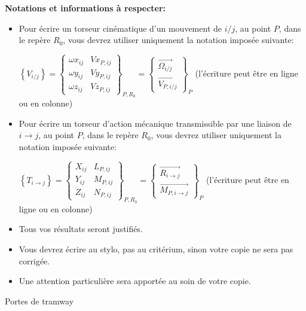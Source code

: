 

\textbf{Notations et informations à respecter:}

\begin{itemize}
 \item Pour écrire un torseur cinématique d'un mouvement de $i/j$, au point $P$, dans le repère $R_0$, vous devrez utiliser uniquement la notation imposée suivante: 

$\left\{V_{i/j}\right\}=\left\{
\begin{matrix}
 \omega x_{ij} & Vx_{P,ij} \\
 \omega y_{ij} & Vy_{P,ij} \\
 \omega z_{ij} & Vz_{P,ij} 
\end{matrix}
\right \}_{P,R_0}=\left \{
\begin{matrix}
 \overrightarrow{\Omega_{i/j}} \\ 
 \overrightarrow{V_{P,i/j}} 
\end{matrix}
\right\}_P$
(l'écriture peut être en ligne ou en colonne)

 \item Pour écrire un torseur d'action mécanique transmissible par une liaison de $i\rightarrow j$, au point $P$, dans le repère $R_0$, vous devrez utiliser uniquement la notation imposée suivante: 

$\left\{T_{i\rightarrow j}\right\}=\left\{
\begin{matrix}
 X_{ij} & {L }_{P,ij} \\
 Y_{ij} & {M }_{P,ij} \\
 Z_{ij} & {N }_{P,ij} 
\end{matrix}
\right \}_{P,R_0}=\left \{
\begin{matrix}
 \overrightarrow{R_{i\rightarrow j}} \\ 
 \overrightarrow{M_{P,i\rightarrow j}} 
\end{matrix}
\right\}_P$
(l'écriture peut être en ligne ou en colonne)

 \item Tous vos résultats seront justifiés.
 \item Vous devrez écrire au stylo, pas au critérium, sinon votre copie ne sera pas corrigée.
 \item Une attention particulière sera apportée au soin de votre copie.
\end{itemize}

\newpage

\begin{center}
\Huge Portes de tramway
\end{center}

